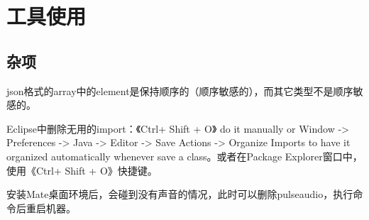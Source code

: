 \section{工具使用}
\subsection{杂项}
\par json格式的array中的element是保持顺序的（顺序敏感的），而其它类型不是顺序敏感的。
\par Eclipse中删除无用的import：《Ctrl+ Shift + O》 do it manually or Window -> Preferences -> Java -> Editor -> Save Actions -> Organize Imports to have it organized automatically whenever save a class。或者在Package Explorer窗口中，使用《Ctrl+ Shift + O》快捷键。
\par 安装Mate桌面环境后，会碰到没有声音的情况，此时可以删除pulseaudio，执行命令后重启机器。
